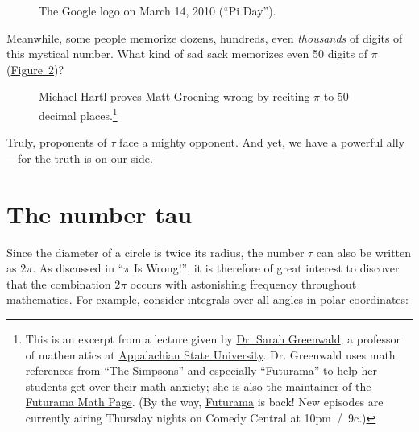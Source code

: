 \documentclass{article}
\begin{document}
\begin{figure}
\begin{center}
\end{center}
\caption{The Google logo on March 14, 2010 (``Pi Day'').\label{fig:google-pi-day}}
\end{figure}

Meanwhile, some people memorize dozens, hundreds, even \href{http://en.wikipedia.org/wiki/Lu_Chao}{\emph{thousands}} of digits of this mystical number. What kind of sad sack memorizes even 50 digits of $\pi$ (\hyperref[fig:futurama_video]{Figure~}\ref{fig:futurama_video})? 

\begin{figure}
\begin{center}
\end{center}
\caption{\href{#sec:about_the_author}{Michael Hartl} proves \href{http://en.wikipedia.org/wiki/Matt_Groening}{Matt Groening} wrong by reciting $\pi$ to 50 decimal places.\footnote{This is an excerpt from a lecture given by \href{http://mathsci.appstate.edu/~sjg/}{Dr. Sarah Greenwald}, a professor of mathematics at \href{http://www.appstate.edu/}{Appalachian State University}. Dr. Greenwald uses math references from ``The Simpsons'' and especially ``Futurama'' to help her students get over their math anxiety; she is also the maintainer of the \href{http://www.mathsci.appstate.edu/~sjg/futurama/}{Futurama Math Page}. (By the way, \href{http://www.comedycentral.com/shows/futurama/index.jhtml}{Futurama} is back! New episodes are currently airing Thursday nights on Comedy Central at 10pm~/~9c.)}\label{fig:futurama_video}}
\end{figure}

Truly, proponents of $\tau$ face a mighty opponent. And yet, we have a powerful ally---for the truth is on our side.


\section{The number tau} %
\label{sec:the_number_tau}

Since the diameter of a circle is twice its radius, the number $\tau$ can also be written as $2\pi$. As discussed in ``$\pi$ Is Wrong!'', it is therefore of great interest to discover that the combination $2\pi$ occurs with astonishing frequency throughout mathematics. For example, consider integrals over all angles in polar coordinates:
\end{document}
